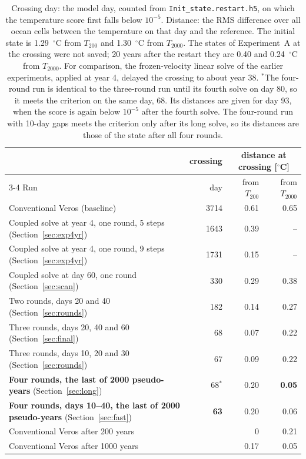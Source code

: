 \documentclass{article}
\begin{document}
\begin{table}[h]
\centering
\renewcommand{\arraystretch}{1.2}
\begin{tabular}{l|r|rr}
\toprule
 & crossing & \multicolumn{2}{c}{distance at crossing [$^\circ$C]} \\
\cmidrule{3-4}
Run & day & from $T_{200}$ & from $T_{2000}$ \\
\midrule
Conventional Veros (baseline) & 3714 & 0.61 & 0.65 \\
Coupled solve at year 4, one round, 5 steps (Section~\ref{sec:exp4yr}) & 1643 & 0.39 & -- \\
Coupled solve at year 4, one round, 9 steps (Section~\ref{sec:exp4yr}) & 1731 & 0.15 & -- \\
Coupled solve at day 60, one round (Section~\ref{sec:scan}) & 330 & 0.29 & 0.38 \\
Two rounds, days 20 and 40 (Section~\ref{sec:rounds}) & 182 & 0.14 & 0.27 \\
Three rounds, days 20, 40 and 60 (Section~\ref{sec:final}) & 68 & 0.07 & 0.22 \\
Three rounds, days 10, 20 and 30 (Section~\ref{sec:rounds}) & 67 & 0.09 & 0.22 \\
\textbf{Four rounds, the last of 2000 pseudo-years} (Section~\ref{sec:long}) & 68$^{*}$ & 0.20 & \textbf{0.05} \\
\textbf{Four rounds, days 10--40, the last of 2000 pseudo-years} (Section~\ref{sec:fast}) & \textbf{63} & 0.20 & 0.06 \\
\midrule
Conventional Veros after 200 years & & 0 & 0.21 \\
Conventional Veros after 1000 years & & 0.17 & 0.05 \\
\bottomrule
\end{tabular}
\caption{Crossing day: the model day, counted from \texttt{Init\_state.restart.h5}, on which the temperature score first falls below $10^{-5}$. Distance: the RMS difference over all ocean cells between the temperature on that day and the reference. The initial state is 1.29~$^\circ$C from $T_{200}$ and 1.30~$^\circ$C from $T_{2000}$. The states of Experiment~A at the crossing were not saved; 20 years after the restart they are 0.40 and 0.24~$^\circ$C from $T_{2000}$. For comparison, the frozen-velocity linear solve of the earlier experiments, applied at year 4, delayed the crossing to about year 38. $^{*}$The four-round run is identical to the three-round run until its fourth solve on day 80, so it meets the criterion on the same day, 68. Its distances are given for day 93, when the score is again below $10^{-5}$ after the fourth solve. The four-round run with 10-day gaps meets the criterion only after its long solve, so its distances are those of the state after all four rounds.}
\label{tab:headline}
\end{table}
\end{document}
